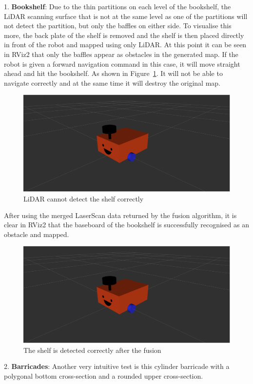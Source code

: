 1. \textbf{Bookshelf}: Due to the thin partitions on each level of the bookshelf, 
the LiDAR scanning surface that is not at the same level as one of the partitions will not detect the partition, 
but only the baffles on either side. To visualise this more, the back plate of the shelf is removed 
and the shelf is then placed directly in front of the robot and mapped using only LiDAR. 
At this point it can be seen in RViz2 that only the baffles appear as obstacles in the generated map. 
If the robot is given a forward navigation command in this case, it will move straight ahead and hit the bookshelf. 
As shown in Figure~\ref{fig:bookshelf}. It will not be able to navigate correctly and at the same time it will destroy the original map.
\begin{figure}[H]
    \centering
    \includegraphics[width=0.8\linewidth]{figs/robot.png}
    \caption{LiDAR cannot detect the shelf correctly}
    \label{fig:bookshelf}
\end{figure}
After using the merged LaserScan data returned by the fusion algorithm, 
it is clear in RViz2 that the baseboard of the bookshelf is successfully recognised as an obstacle and mapped.
\begin{figure}[H]
    \centering
    \includegraphics[width=0.8\linewidth]{figs/robot.png}
    \caption{The shelf is detected correctly after the fusion}
\end{figure}
2. \textbf{Barricades}: Another very intuitive test is this cylinder barricade 
with a polygonal bottom cross-section and a rounded upper cross-section.
